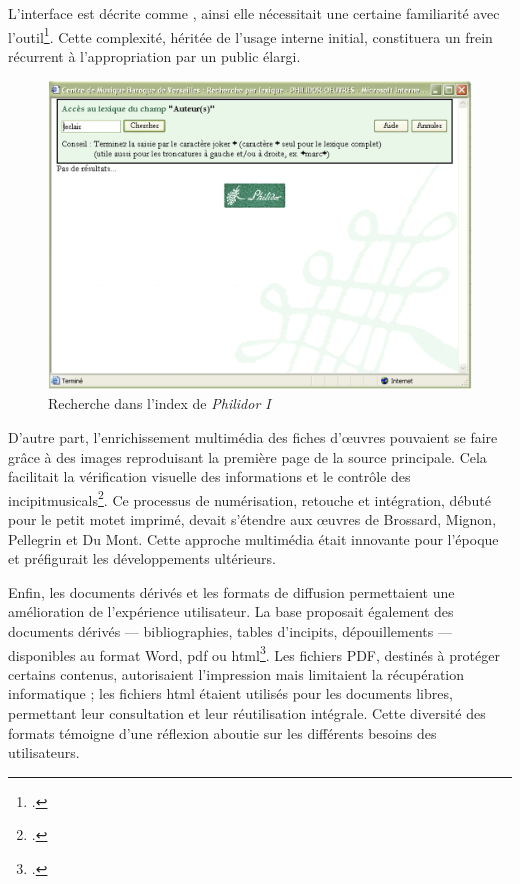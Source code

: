 L'interface est décrite comme , ainsi elle nécessitait une certaine familiarité avec l'outil\footcite[Rapport sur le projet Philidor de Jérémie Crublet, juin 2006]{michelbenoitDocumentationTechniqueBibliographique1997}. Cette complexité, héritée de l'usage interne initial, constituera un frein récurrent à l'appropriation par un public élargi.

\begin{figure}[h]
	\caption{Recherche dans l'index de \textit{Philidor I}} \label{philidor_i_index}
	\centering
	\includegraphics[width=\textwidth]{images/philidor1_index.png}
\end{figure}

D'autre part, l'enrichissement multimédia des fiches d'œuvres pouvaient se faire grâce à des images reproduisant la première page de la source principale. Cela facilitait la vérification visuelle des informations et le contrôle des \glspl{incipitmusical}\footcite[Conseil scientifique, bilan de l'année 2001]{michelbenoitDocumentationTechniqueBibliographique1997}. Ce processus de numérisation, retouche et intégration, débuté pour le petit motet imprimé, devait s'étendre aux œuvres de Brossard, Mignon, Pellegrin et Du Mont. Cette approche multimédia était innovante pour l'époque et préfigurait les développements ultérieurs.

Enfin, les documents dérivés et les formats de diffusion permettaient une amélioration de l'expérience utilisateur. La base proposait également des documents dérivés — bibliographies, tables d'incipits, dépouillements — disponibles au format Word, \gls{pdf} ou \gls{html}\footcite[Conseil scientifique, bilan de l'année 2001]{michelbenoitDocumentationTechniqueBibliographique1997}. Les fichiers PDF, destinés à protéger certains contenus, autorisaient l'impression mais limitaient la récupération informatique ; les fichiers \gls{html} étaient utilisés pour les documents libres, permettant leur consultation et leur réutilisation intégrale. Cette diversité des formats témoigne d'une réflexion aboutie sur les différents besoins des utilisateurs.

